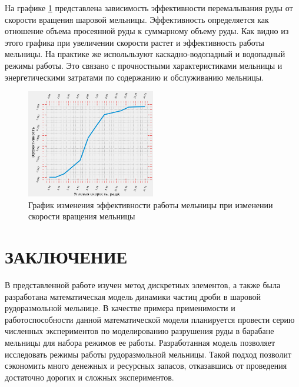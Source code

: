 \documentclass[utf8x, 14pt, oneside, a4paper]{article}
\begin{document}
На графике \ref{pic:efficiency} представлена зависимость эффективности перемалывания руды от скорости вращения шаровой мельницы. 
Эффективность определяется как отношение объема просеянной руды к суммарному объему руды.
Как видно из этого графика при увеличении скорости растет и эффективность работы мельницы.
На практике же испольльзуют каскадно-водопадный и водопадный режимы работы.
Это связано с прочностными характеристиками мельницы и энергетическими затратами по содержанию и обслуживанию мельницы.
\begin{figure}[H]
	\centering
	\includegraphics[width=0.5\textwidth]{efficiency} 
	\caption{График изменения эффективности работы мельницы при изменении скорости вращения мельницы}
	\label{pic:efficiency}
\end{figure} 

		\pagebreak
		
	\section*{ЗАКЛЮЧЕНИЕ}

В представленной работе изучен метод дискретных элементов, а также была разработана математическая модель динамики частиц дроби в шаровой рудоразмольной мельнице.
В качестве примера применимости и работоспособности данной математической модели планируется провести серию численных экспериментов по моделированию разрушения руды в барабане мельницы для набора режимов ее работы.
Разработанная модель позволяет исследовать режимы работы рудоразмольной мельницы.
Такой подход позволит сэкономить много денежных и ресурсных запасов, отказавшись от проведения достаточно дорогих и сложных экспериментов.

		\pagebreak
\end{document}
